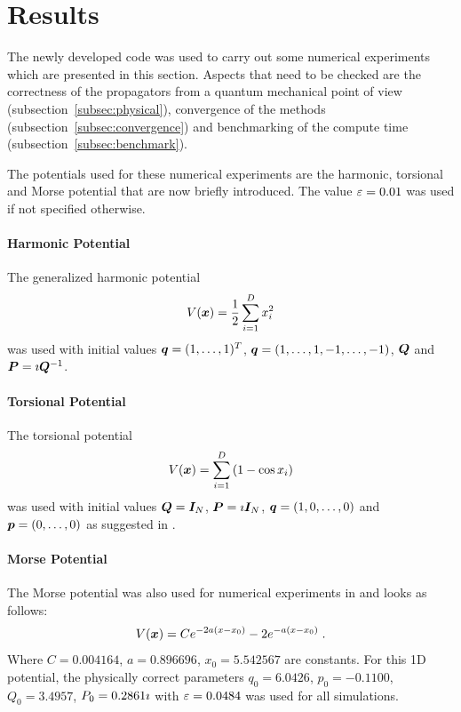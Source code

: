 \section{Results}
\label{sec:results}
%
The newly developed code was used to carry out some numerical experiments which are presented in this section.
Aspects that need to be checked are the correctness of the propagators from a quantum mechanical point of view (subsection~\ref{subsec:physical}), convergence of the methods (subsection~\ref{subsec:convergence}) and benchmarking of the compute time (subsection~\ref{subsec:benchmark}).
\par\medskip
%
The potentials used for these numerical experiments are the harmonic, torsional and Morse potential that are now briefly introduced.
The value $\varepsilon = 0.01$ was used if not specified otherwise.


\paragraph{Harmonic Potential}
The generalized harmonic potential
\begin{align}
	\label{math:harmonic}
	V(\bm{x}) = \frac{1}{2} \sum_{i=1}^D x_i^2
\end{align}
%
was used with initial values $\bm{q} = (1,\dots,1)^T$, $\bm{q} = (1,\dots,1,-1,\dots,-1)$, $\bm{Q}$ and $\bm{P} = \imath \bm{Q}^{-1}$. \\
\par\medskip


\paragraph{Torsional Potential}
The torsional potential
%
\begin{align}
	\label{math:torsional}
	V(\bm{x}) = \sum_{i=1}^D \left( 1 - \cos x_i \right)
\end{align}
%
was used with initial values $\bm{Q} = \bm{I}_N$, $\bm{P} = \imath \bm{I}_N$, $\bm{q} = (1,0,\dots,0)$ and $\bm{p} = (0,\dots,0)$ as suggested in \cite{FGL_semiclassical_dynamics}.

\paragraph{Morse Potential}
%
The Morse potential was also used for numerical experiments in \cite{Unpublished} and looks as follows:
%
\begin{align}
	\label{math:morse}
	V(\bm{x}) = C e^{-2a(x-x_0)} - 2 e^{-a(x-x_0)} \; .
\end{align}
%
Where $C = 0.004164$, $a=0.896696$, $x_0 = 5.542567$ are constants.
For this 1D potential, the physically correct parameters $q_0 = 6.0426$, $p_0 = -0.1100$, $Q_0 = 3.4957$, $P_0 = 0.2861 \imath$ with $\varepsilon = 0.0484$ was used for all simulations.



